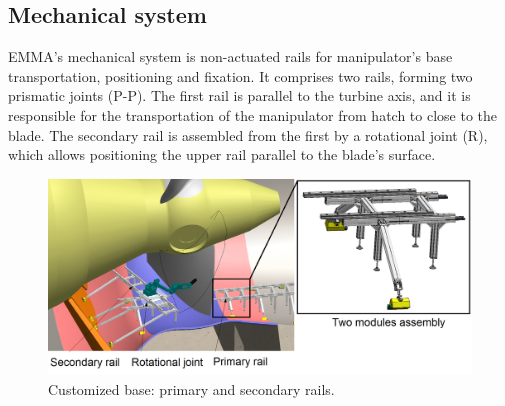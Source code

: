 % 


 

\subsection{Mechanical system}

EMMA's mechanical system is non-actuated rails for manipulator's base
transportation, positioning and fixation. It comprises two rails, forming two
prismatic joints (P-P). The first rail is parallel to the
turbine axis, and it is responsible for the transportation of the manipulator from
hatch to close to the blade. The secondary rail is assembled from the first by
a rotational joint (R), which allows positioning the upper rail parallel to the
blade's surface.

\begin{figure}
	\centering
	\includegraphics[width=1.0\columnwidth]{figs/mecanica/EMMA_Base_Secundaria_03.PNG}
    \caption{Customized base: primary and secondary rails.}
    \label{fig:base}
\end{figure}

